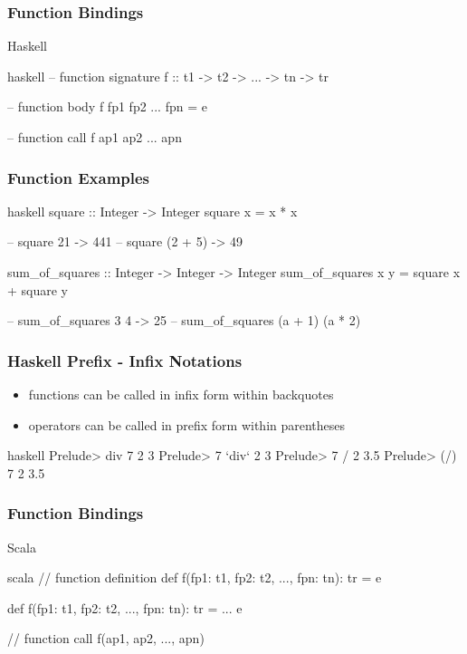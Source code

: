 \documentclass[dvipsnames]{beamer}
\theoremstyle{plain}
\begin{document}
\begin{frame}[fragile]
  \frametitle{Function Bindings}

  \begin{block}{Haskell}
    \begin{pygments}{haskell}
-- function signature
f :: t1 -> t2 -> ... -> tn -> tr

-- function body
f fp1 fp2 ... fpn = e

-- function call
f ap1 ap2 ... apn
    \end{pygments}
  \end{block}
\end{frame}

\begin{frame}[fragile]
  \frametitle{Function Examples}

  \begin{example}[Haskell]
    \begin{pygments}{haskell}
square :: Integer -> Integer
square x = x * x

-- square 21 -> 441
-- square (2 + 5) -> 49

sum_of_squares :: Integer -> Integer -> Integer
sum_of_squares x y = square x + square y

-- sum_of_squares 3 4 -> 25
-- sum_of_squares (a + 1) (a * 2)
    \end{pygments}
  \end{example}
\end{frame}

\begin{frame}[fragile]
  \frametitle{Haskell Prefix - Infix Notations}

  \begin{itemize}
    \item functions can be called in infix form within backquotes
    \item operators can be called in prefix form within parentheses
  \end{itemize}

  \begin{example}
    \begin{pygments}{haskell}
Prelude> div 7 2
3
Prelude> 7 `div` 2
3
Prelude> 7 / 2
3.5
Prelude> (/) 7 2
3.5
    \end{pygments}
  \end{example}
\end{frame}

\begin{frame}[fragile]
  \frametitle{Function Bindings}

  \begin{block}{Scala}
    \begin{pygments}{scala}
// function definition
def f(fp1: t1, fp2: t2, ..., fpn: tn): tr = e

def f(fp1: t1, fp2: t2, ..., fpn: tn): tr = {
    ...
    e
}

// function call
f(ap1, ap2, ..., apn)
    \end{pygments}
  \end{block}
\end{frame}
\end{document}
